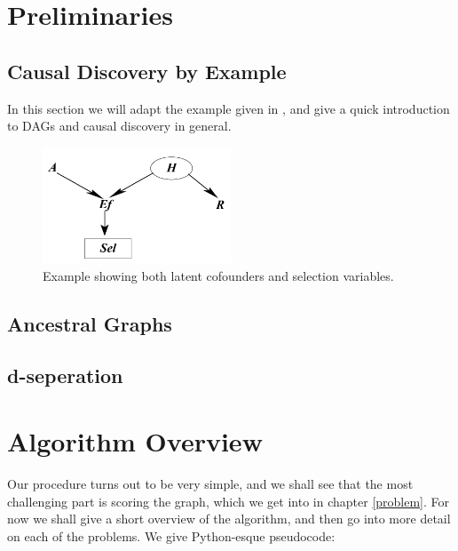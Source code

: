 \documentclass[11pt,a4paper]{report}
\begin{document}
\chapter{Preliminaries}\label{preliminaries}
\section{Causal Discovery by Example}
In this section we will adapt the example given in
\cite{zhangCompletenessOrientationRules2008}, and give a quick
introduction to DAGs and causal discovery in general.

\begin{figure}
  \centering
  \includegraphics[width=0.5\textwidth]{imgs/example1.png}
  \caption{Example showing both latent cofounders and selection variables.}
  \label{example}
\end{figure}

\section{Ancestral Graphs}

\section{d-seperation}

\chapter{Algorithm Overview}\label{algorithm}
Our procedure turns out to be very simple, and we shall see that the most
challenging part is scoring the graph, which we get into in chapter
\ref{problem}. For now we shall give a short overview of the algorithm,
and then go into more detail on each of the problems. We give Python-esque
pseudocode:
\end{document}
